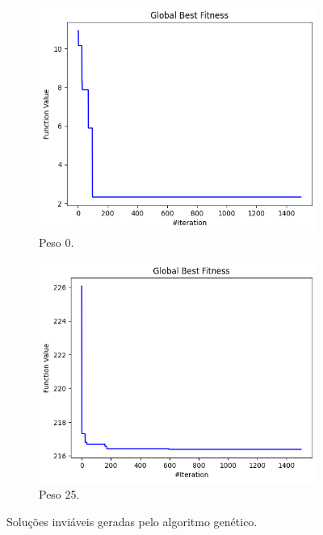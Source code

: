 \begin{figure}
    \centering
    \begin{subfigure}{.5\textwidth}
        \centering
        \includegraphics[width=1\linewidth]{images/non_viable/0/GA.png}
        \caption{Peso 0.}
    \end{subfigure}%
    \begin{subfigure}{.5\textwidth}
        \centering
        \includegraphics[width=1\linewidth]{images/non_viable/25/GA.png}
        \caption{Peso 25.}
    \end{subfigure}%
    \caption{Soluções inviáveis geradas pelo algoritmo genético.}%
    \label{fig:non-viable-ga}
\end{figure}

